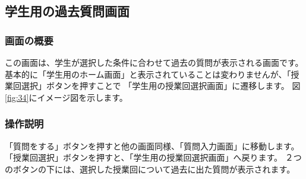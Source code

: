 \newpage

\subsection{学生用の過去質問画面}
\subsubsection{画面の概要}
この画面は、学生が選択した条件に合わせて過去の質問が表示される画面です。
基本的に「学生用のホーム画面」と表示されていることは変わりませんが、「授業回選択」ボタンを押すことで
「学生用の授業回選択画面」に遷移します。
図\ref{fig:34}にイメージ図を示します。

\subsubsection{操作説明}
「質問をする」ボタンを押すと他の画面同様、「質問入力画面」に移動します。
「授業回選択」ボタンを押すと、「学生用の授業回選択画面」へ戻ります。
２つのボタンの下には、選択した授業回について過去に出た質問が表示されます。




